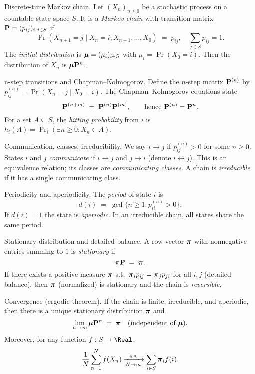 \documentclass[aspectratio=169]{beamer}
\begin{document}
\begin{frame}{Discrete-time Markov chain.}
Let $(X_n)_{n\ge 0}$ be a stochastic process on a countable state space $S$.
It is a \emph{Markov chain} with transition matrix $\mathbf{P}=(p_{ij})_{i,j\in S}$ if
\[
\Pr(X_{n+1}=j \mid X_n=i, X_{n-1},\ldots,X_0) \;=\; p_{ij}, \quad \sum_{j\in S} p_{ij}=1.
\]
The \emph{initial distribution} is $\mbox{\boldmath $\mu$}=(\mu_i)_{i\in S}$ with $\mu_i=\Pr(X_0=i)$.
Then the distribution of $X_n$ is $\mbox{\boldmath $\mu$} \mathbf{P}^n$.
\end{frame}

\begin{frame}{n-step transitions and Chapman--Kolmogorov.}
Define the $n$-step matrix $\mathbf{P}^{(n)}$ by $p^{(n)}_{ij}=\Pr(X_n=j\mid X_0=i)$.
The Chapman--Kolmogorov equations state
\[
\mathbf{P}^{(n+m)} \;=\; \mathbf{P}^{(n)} \mathbf{P}^{(m)}, \qquad \text{hence } \mathbf{P}^{(n)}=\mathbf{P}^n.
\]
For a set $A\subseteq S$, the \emph{hitting probability} from $i$ is
$h_i(A)=\Pr_i(\exists n\ge 0: X_n\in A)$.
\end{frame}

\begin{frame}{Communication, classes, irreducibility.}
We say $i\to j$ if $p^{(n)}_{ij}>0$ for some $n\ge 0$.
States $i$ and $j$ \emph{communicate} if $i\to j$ and $j\to i$ (denote $i\leftrightarrow j$).
This is an equivalence relation; its classes are \emph{communicating classes}.
A chain is \emph{irreducible} if it has a single communicating class.
\end{frame}

\begin{frame}{Periodicity and aperiodicity.}
The \emph{period} of state $i$ is
\[
d(i) \;=\; \gcd\{ n\ge 1 : p^{(n)}_{ii}>0\}.
\]
If $d(i)=1$ the state is \emph{aperiodic}. In an irreducible chain, all states share the same period.
\end{frame}

\begin{frame}{Stationary distribution and detailed balance.}
A row vector $\mbox{\boldmath$\pi$}$ with nonnegative entries summing to $1$ is \emph{stationary} if
\[
\mbox{\boldmath$\pi$} \mathbf{P} \;=\; \mbox{\boldmath$\pi$}.
\]
If there exists a positive measure $\mbox{\boldmath$\pi$}$ s.t.\ $\mbox{\boldmath$\pi$}_i p_{ij} = \mbox{\boldmath$\pi$}_j p_{ji}$ for all $i,j$ (detailed balance),
then $\mbox{\boldmath$\pi$}$ (normalized) is stationary and the chain is \emph{reversible}.
\end{frame}

\begin{frame}{Convergence (ergodic theorem).}
If the chain is finite, irreducible, and aperiodic, then there is a unique stationary distribution $\mbox{\boldmath$\pi$}$ and
\[
\lim_{n\to\infty} \mbox{\boldmath $\mu$} \mathbf{P}^n \;=\; \mbox{\boldmath$\pi$} \quad \text{(independent of $\mbox{\boldmath $\mu$}$).}
\]
Moreover, for any function $f:S\to\Real$,
\[
\frac{1}{N}\sum_{n=1}^N f(X_n) \xrightarrow[N\to\infty]{\text{a.s.}} \sum_{i\in S} \mbox{\boldmath$\pi$}_i f(i).
\]
\end{frame}
\end{document}
